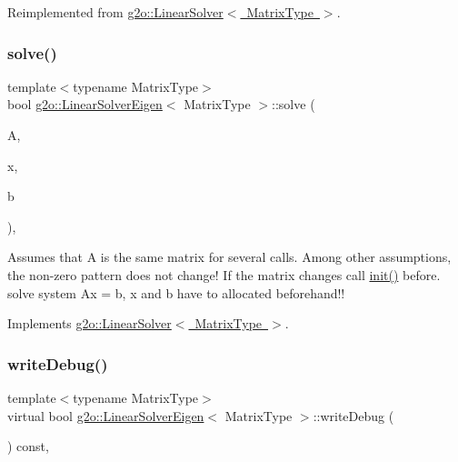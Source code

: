 Reimplemented from \mbox{\hyperlink{classg2o_1_1_linear_solver_a969c406ccacc38705b2a88f5ed23cb9a}{g2o\+::\+Linear\+Solver$<$ Matrix\+Type $>$}}.

\mbox{\label{classg2o_1_1_linear_solver_eigen_ae4ac566af324a238a31145c1e50b52e1}} 
\subsubsection{\texorpdfstring{solve()}{solve()}}
{\footnotesize\ttfamily template$<$typename Matrix\+Type$>$ \\
bool \mbox{\hyperlink{classg2o_1_1_linear_solver_eigen}{g2o\+::\+Linear\+Solver\+Eigen}}$<$ Matrix\+Type $>$\+::solve (\begin{DoxyParamCaption}\item[{const \mbox{\hyperlink{classg2o_1_1_sparse_block_matrix}{Sparse\+Block\+Matrix}}$<$ Matrix\+Type $>$ \&}]{A,  }\item[{double $\ast$}]{x,  }\item[{double $\ast$}]{b }\end{DoxyParamCaption})\hspace{0.3cm}{\ttfamily [inline]}, {\ttfamily [virtual]}}

Assumes that A is the same matrix for several calls. Among other assumptions, the non-\/zero pattern does not change! If the matrix changes call \mbox{\hyperlink{classg2o_1_1_linear_solver_eigen_a8fca4bb987dcbeb94a366b1532dee139}{init()}} before. solve system Ax = b, x and b have to allocated beforehand!! 

Implements \mbox{\hyperlink{classg2o_1_1_linear_solver_aa44b40826d50203c8ce2ff258c34e030}{g2o\+::\+Linear\+Solver$<$ Matrix\+Type $>$}}.

\mbox{\label{classg2o_1_1_linear_solver_eigen_ad9bccc1b4bcd3cc5e107ac09ac93cf4b}} 
\subsubsection{\texorpdfstring{write\+Debug()}{writeDebug()}}
{\footnotesize\ttfamily template$<$typename Matrix\+Type$>$ \\
virtual bool \mbox{\hyperlink{classg2o_1_1_linear_solver_eigen}{g2o\+::\+Linear\+Solver\+Eigen}}$<$ Matrix\+Type $>$\+::write\+Debug (\begin{DoxyParamCaption}{ }\end{DoxyParamCaption}) const\hspace{0.3cm}{\ttfamily [inline]}, {\ttfamily [virtual]}}



